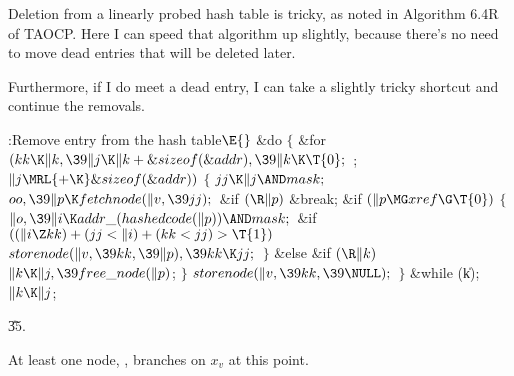 Deletion from a linearly probed hash table is tricky, as noted in
Algorithm 6.4R of TAOCP. Here I can speed that algorithm up slightly,
because there's no need to move dead entries that will be deleted later.

Furthermore, if I do meet a dead entry, I can take a slightly tricky
shortcut and continue the removals.

\Y\B\4:Remove entry  from the hash table\X${}\E{}$\6
\&{do}\5
${}\{{}$\1\6
\&{for} ${}(\\{kk}\K\|k,\39\|j\K\|k+\&{sizeof}(\&{addr}),\39\|k\K\T{0};{}$  ;
${}\|j\MRL{+{\K}}\&{sizeof}(\&{addr})){}$\5
${}\{{}$\1\6
${}\\{jj}\K\|j\AND\\{mask};{}$\6
${}\\{oo},\39\|p\K\\{fetchnode}(\|v,\39\\{jj});{}$\6
\&{if} ${}(\R\|p){}$\1\5
\&{break};\2\6
\&{if} ${}(\|p\MG\\{xref}\G\T{0}){}$\5
${}\{{}$\1\6
${}\|o,\39\|i\K\\{addr\_}(\\{hashedcode}(\|p))\AND\\{mask};{}$\6
\&{if} ${}((\|i\Z\\{kk})+(\\{jj}<\|i)+(\\{kk}<\\{jj})>\T{1}){}$\1\5
${}\\{storenode}(\|v,\39\\{kk},\39\|p),\39\\{kk}\K\\{jj};{}$\2\6
\4${}\}{}$\5
\2\&{else} \&{if} ${}(\R\|k){}$\1\5
${}\|k\K\|j,\39\\{free\_node}(\|p){}$;\2\6
\4${}\}{}$\2\6
${}\\{storenode}(\|v,\39\\{kk},\39\NULL);{}$\6
\4${}\}{}$\2\5
\&{while} (\|k);\6
${}\|k\K\|j{}$;\par
\U35.\fi

At least one node, , branches on $x_v$ at this
point.

